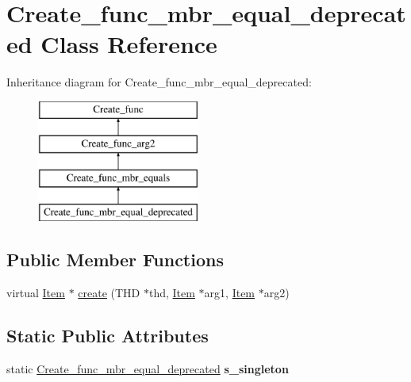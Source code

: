 \hypertarget{classCreate__func__mbr__equal__deprecated}{}\section{Create\+\_\+func\+\_\+mbr\+\_\+equal\+\_\+deprecated Class Reference}
\label{classCreate__func__mbr__equal__deprecated}
Inheritance diagram for Create\+\_\+func\+\_\+mbr\+\_\+equal\+\_\+deprecated\+:\begin{figure}[H]
\begin{center}
\leavevmode
\includegraphics[height=4.000000cm]{classCreate__func__mbr__equal__deprecated}
\end{center}
\end{figure}
\subsection*{Public Member Functions}
\begin{DoxyCompactItemize}
\item 
virtual \mbox{\hyperlink{classItem}{Item}} $\ast$ \mbox{\hyperlink{classCreate__func__mbr__equal__deprecated_a6708b6d887e06cb9751f3e2b5dda6304}{create}} (T\+HD $\ast$thd, \mbox{\hyperlink{classItem}{Item}} $\ast$arg1, \mbox{\hyperlink{classItem}{Item}} $\ast$arg2)
\end{DoxyCompactItemize}
\subsection*{Static Public Attributes}
\begin{DoxyCompactItemize}
\item 
\mbox{\label{classCreate__func__mbr__equal__deprecated_a3070158ea8b8bff2230a39fe13a4630c}} 
static \mbox{\hyperlink{classCreate__func__mbr__equal__deprecated}{Create\+\_\+func\+\_\+mbr\+\_\+equal\+\_\+deprecated}} {\bfseries s\+\_\+singleton}
\end{DoxyCompactItemize}
